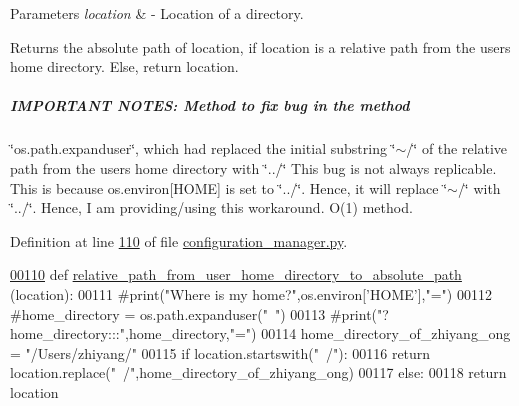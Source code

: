 \begin{DoxyParams}{Parameters}
{\em location} & -\/ Location of a directory. \\
\hline
\end{DoxyParams}
\begin{DoxyReturn}{Returns}
the absolute path of location, if location is a relative path from the user\textquotesingle{}s home directory. Else, return location. \subparagraph*{I\+M\+P\+O\+R\+T\+A\+N\+T N\+O\+T\+E\+S\+: Method to fix bug in the method}
\end{DoxyReturn}
\char`\"{}os.\+path.\+expanduser\char`\"{}, which had replaced the initial substring \char`\"{}$\sim$/\char`\"{} of the relative path from the user\textquotesingle{}s home directory with \char`\"{}../\char`\"{} This bug is not always replicable. This is because os.\+environ\mbox{[}\textquotesingle{}H\+O\+M\+E\textquotesingle{}\mbox{]} is set to \char`\"{}../\char`\"{}. Hence, it will replace \char`\"{}$\sim$/\char`\"{} with \char`\"{}../\char`\"{}. Hence, I am providing/using this workaround. O(1) method. 

Definition at line \hyperlink{configuration__manager_8py_source_l00110}{110} of file \hyperlink{configuration__manager_8py_source}{configuration\+\_\+manager.\+py}.


\begin{DoxyCode}
\hypertarget{classutilities_1_1configuration__manager_1_1config__manager_l00110}{}\hyperlink{classutilities_1_1configuration__manager_1_1config__manager_a15f03ca784cab4d34b95dc020f3b0c23}{00110}     \textcolor{keyword}{def }\hyperlink{classutilities_1_1configuration__manager_1_1config__manager_a15f03ca784cab4d34b95dc020f3b0c23}{relative\_path\_from\_user\_home\_directory\_to\_absolute\_path}
      (location):
00111         \textcolor{comment}{#print("Where is my home?",os.environ['HOME'],"=")}
00112         \textcolor{comment}{#home\_directory = os.path.expanduser("~")}
00113         \textcolor{comment}{#print("?   home\_directory:::",home\_directory,"=")}
00114         home\_directory\_of\_zhiyang\_ong = \textcolor{stringliteral}{"/Users/zhiyang/"}
00115         \textcolor{keywordflow}{if} location.startswith(\textcolor{stringliteral}{"~/"}):
00116             \textcolor{keywordflow}{return} location.replace(\textcolor{stringliteral}{"~/"},home\_directory\_of\_zhiyang\_ong)
00117         \textcolor{keywordflow}{else}:
00118             \textcolor{keywordflow}{return} location
\end{DoxyCode}
\hypertarget{classutilities_1_1configuration__manager_1_1config__manager_a3ac8c649652805fc0bddd2b6d8187329}{}
